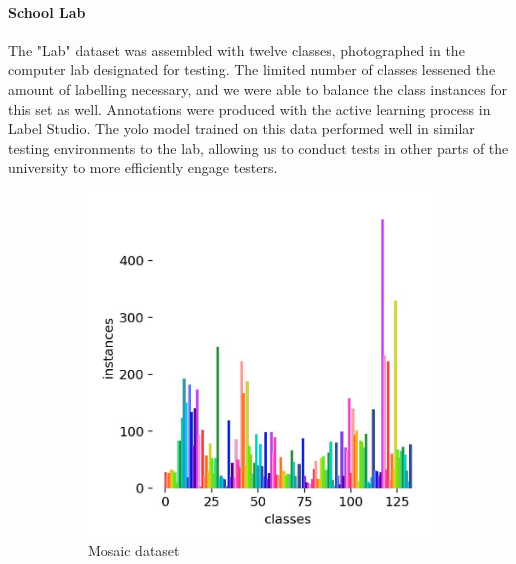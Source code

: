 \documentclass[thesis]{fputhesis}
\begin{document}
\begin{body}
\paragraph{School Lab}
The "Lab" dataset was assembled with twelve classes, photographed  in the computer lab designated for testing. The limited number of classes lessened the amount of labelling necessary, and we were able to balance the class instances for this set as well. Annotations were produced with the active learning process in Label Studio. The \acrshort{yolo} model trained on this data performed well in similar testing environments to the lab, allowing us to conduct tests in other parts of the university to more efficiently engage testers.
\begin{figure}[h]
    \centering
    \begin{subfigure}[]{0.3\textwidth}
        \includegraphics[width=\textwidth]{Images/mosaic-labels.jpg}
        \caption{Mosaic dataset}
        \label{fig:mosaic-dataset}
    \end{subfigure}
    \begin{subfigure}[]{0.3\textwidth}

\end{subfigure}
\end{figure}
\end{body}
\end{document}
